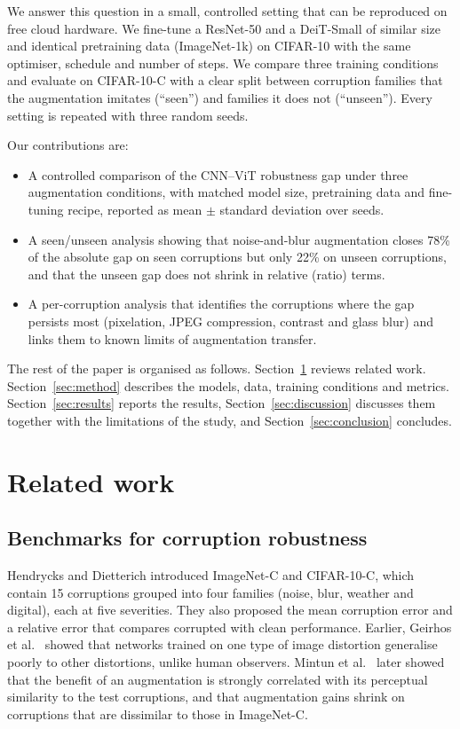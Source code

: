 \documentclass[a4paper,11pt]{article}
\begin{document}
We answer this question in a small, controlled setting that can be reproduced on free cloud hardware. We fine-tune a ResNet-50 \cite{he2016deep} and a DeiT-Small \cite{touvron2021training} of similar size and identical pretraining data (ImageNet-1k) on CIFAR-10 with the same optimiser, schedule and number of steps. We compare three training conditions and evaluate on CIFAR-10-C with a clear split between corruption families that the augmentation imitates (``seen'') and families it does not (``unseen''). Every setting is repeated with three random seeds.

Our contributions are:
\begin{itemize}
\item A controlled comparison of the CNN--ViT robustness gap under three augmentation conditions, with matched model size, pretraining data and fine-tuning recipe, reported as mean $\pm$ standard deviation over seeds.
\item A seen/unseen analysis showing that noise-and-blur augmentation closes 78\% of the absolute gap on seen corruptions but only 22\% on unseen corruptions, and that the unseen gap does not shrink in relative (ratio) terms.
\item A per-corruption analysis that identifies the corruptions where the gap persists most (pixelation, JPEG compression, contrast and glass blur) and links them to known limits of augmentation transfer.
\end{itemize}

The rest of the paper is organised as follows. Section~\ref{sec:related} reviews related work. Section~\ref{sec:method} describes the models, data, training conditions and metrics. Section~\ref{sec:results} reports the results, Section~\ref{sec:discussion} discusses them together with the limitations of the study, and Section~\ref{sec:conclusion} concludes.

\section{Related work}
\label{sec:related}

\subsection{Benchmarks for corruption robustness}
Hendrycks and Dietterich \cite{hendrycks2019benchmarking} introduced ImageNet-C and CIFAR-10-C, which contain 15 corruptions grouped into four families (noise, blur, weather and digital), each at five severities. They also proposed the mean corruption error and a relative error that compares corrupted with clean performance. Earlier, Geirhos et al.\ \cite{geirhos2018generalisation} showed that networks trained on one type of image distortion generalise poorly to other distortions, unlike human observers. Mintun et al.\ \cite{mintun2021interaction} later showed that the benefit of an augmentation is strongly correlated with its perceptual similarity to the test corruptions, and that augmentation gains shrink on corruptions that are dissimilar to those in ImageNet-C.
\end{document}
